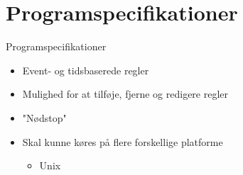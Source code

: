 \section{Programspecifikationer}
\begin{frame}{Programspecifikationer}{}
\begin{itemize}
	\item Event- og tidsbaserede regler
	\item Mulighed for at tilføje, fjerne og redigere regler
	\item "Nødstop"
	\item Skal kunne køres på flere forskellige platforme
	\begin{itemize}
		\item Unix
	\end{itemize}
\end{itemize}
\end{frame}